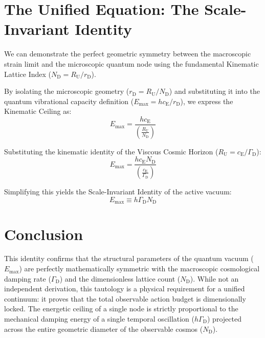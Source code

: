 \section{The Unified Equation: The Scale-Invariant Identity}
We can demonstrate the perfect geometric symmetry between the macroscopic strain limit and the microscopic quantum node using the fundamental Kinematic Lattice Index ($N_{\mathrm{D}} = R_{\mathrm{U}}/r_{\mathrm{D}}$).

By isolating the microscopic geometry ($r_{\mathrm{D}} = R_{\mathrm{U}} / N_{\mathrm{D}}$) and substituting it into the quantum vibrational capacity definition ($E_{\mathrm{max}} = h c_{\mathrm{E}}/r_{\mathrm{D}}$), we express the Kinematic Ceiling as:
\begin{equation}
    E_{\mathrm{max}} = \frac{h c_{\mathrm{E}}}{\left( \frac{R_{\mathrm{U}}}{N_{\mathrm{D}}} \right)}
\end{equation}

Substituting the kinematic identity of the Viscous Cosmic Horizon ($R_{\mathrm{U}} = c_{\mathrm{E}} / \Gamma_{\mathrm{D}}$):
\begin{equation}
    E_{\mathrm{max}} = \frac{h c_{\mathrm{E}} N_{\mathrm{D}}}{\left( \frac{c_{\mathrm{E}}}{\Gamma_{\mathrm{D}}} \right)}
\end{equation}

Simplifying this yields the Scale-Invariant Identity of the active vacuum:
\begin{equation}
    E_{\mathrm{max}} \equiv h \Gamma_{\mathrm{D}} N_{\mathrm{D}}
\end{equation}

\section{Conclusion}
This identity confirms that the structural parameters of the quantum vacuum ($E_{\mathrm{max}}$) are perfectly mathematically symmetric with the macroscopic cosmological damping rate ($\Gamma_{\mathrm{D}}$) and the dimensionless lattice count ($N_{\mathrm{D}}$). While not an independent derivation, this tautology is a physical requirement for a unified continuum: it proves that the total observable action budget is dimensionally locked. The energetic ceiling of a single node is strictly proportional to the mechanical damping energy of a single temporal oscillation ($h \Gamma_{\mathrm{D}}$) projected across the entire geometric diameter of the observable cosmos ($N_{\mathrm{D}}$).
